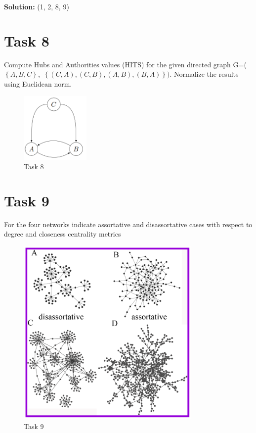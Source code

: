 \documentclass{cernatsnote}
\begin{document}
\textbf{Solution:}  (1, 2, 8, 9)
\section{Task 8} 
Compute Hubs and Authorities values (HITS) for the given directed graph G=( 
\begin{math} 
\left\{ A,B,C \right\},
\end{math}
\begin{math} 
\left\{ (C,A),(C,B),(A,B),(B,A) \right\}).
\end{math}
Normalize the results using Euclidean norm.

\begin{figure}[h!]
\centering
\includegraphics[width=0.3\textwidth]{images/task8.png}
\caption{\label{fig:task8} Task 8}
\end{figure}

\section{Task 9} 
For the four networks indicate assortative and disassortative cases with respect to degree and closeness centrality metrics

\begin{figure}[h!]
\centering
\includegraphics[width=0.8\textwidth]{images/task9.png}
\caption{\label{fig:task9} Task 9}
\end{figure}
\end{document}
